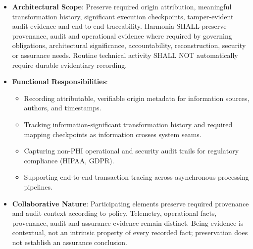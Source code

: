 
\begin{itemize}

\item
\textbf{Architectural Scope}: Preserve required origin attribution, meaningful transformation history, significant execution checkpoints, tamper-evident audit evidence and end-to-end traceability. Harmonia SHALL preserve provenance, audit and operational evidence where required by governing obligations, architectural significance, accountability, reconstruction, security or assurance needs. Routine technical activity SHALL NOT automatically require durable evidentiary recording.



\item
\textbf{Functional Responsibilities}:


\begin{itemize}

\item
Recording attributable, verifiable origin metadata for information sources, authors, and timestamps.



\item
Tracking information-significant transformation history and required mapping checkpoints as information crosses system seams.



\item
Capturing non-PHI operational and security audit trails for regulatory compliance (HIPAA, GDPR).



\item
Supporting end-to-end transaction tracing across asynchronous processing pipelines.



\end{itemize}


\item
\textbf{Collaborative Nature}: Participating elements preserve required provenance and audit context according to policy. Telemetry, operational facts, provenance, audit and assurance evidence remain distinct. Being evidence is contextual, not an intrinsic property of every recorded fact; preservation does not establish an assurance conclusion.



\end{itemize}

